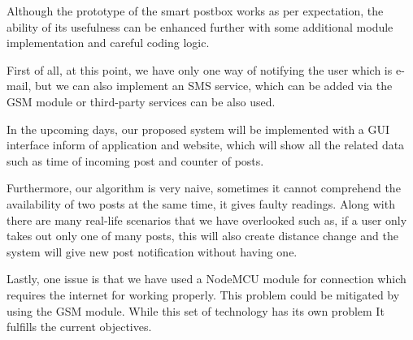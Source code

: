 \label{chapter:Future Scope}
Although the prototype of the smart postbox works as per expectation, the ability of its usefulness can be enhanced further with some additional module implementation and careful coding logic.

First of all, at this point, we have only one way of notifying the user which is e-mail, but we can also implement an SMS service, which can be added via the GSM module or third-party services can be also used.

In the upcoming days, our proposed system will be implemented with a GUI interface inform of application and website, which will show all the related data such as time of incoming post and counter of posts. 

Furthermore, our algorithm is very naive, sometimes it cannot comprehend the availability of two posts at the same time, it gives faulty readings. Along with there are many real-life scenarios that we have overlooked such as, if a user only takes out only one of many posts, this will also create distance change and the system will give new post notification without having one. 

Lastly, one issue is that we have used a NodeMCU module for connection which requires the internet for working properly. This problem could be mitigated by using the GSM module. While this set of technology has its own problem It fulfills the current objectives. 